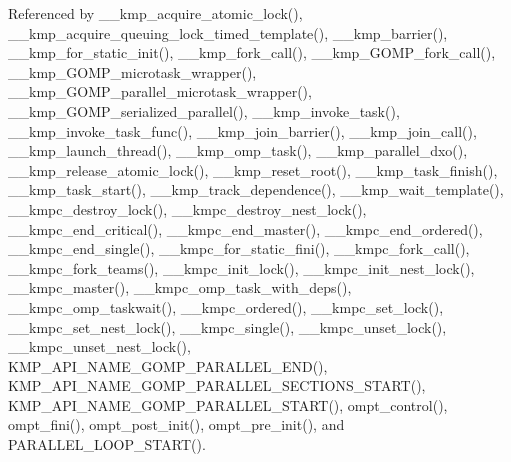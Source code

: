 Referenced by \-\_\-\-\_\-kmp\-\_\-acquire\-\_\-atomic\-\_\-lock(), \-\_\-\-\_\-kmp\-\_\-acquire\-\_\-queuing\-\_\-lock\-\_\-timed\-\_\-template(), \-\_\-\-\_\-kmp\-\_\-barrier(), \-\_\-\-\_\-kmp\-\_\-for\-\_\-static\-\_\-init(), \-\_\-\-\_\-kmp\-\_\-fork\-\_\-call(), \-\_\-\-\_\-kmp\-\_\-\-G\-O\-M\-P\-\_\-fork\-\_\-call(), \-\_\-\-\_\-kmp\-\_\-\-G\-O\-M\-P\-\_\-microtask\-\_\-wrapper(), \-\_\-\-\_\-kmp\-\_\-\-G\-O\-M\-P\-\_\-parallel\-\_\-microtask\-\_\-wrapper(), \-\_\-\-\_\-kmp\-\_\-\-G\-O\-M\-P\-\_\-serialized\-\_\-parallel(), \-\_\-\-\_\-kmp\-\_\-invoke\-\_\-task(), \-\_\-\-\_\-kmp\-\_\-invoke\-\_\-task\-\_\-func(), \-\_\-\-\_\-kmp\-\_\-join\-\_\-barrier(), \-\_\-\-\_\-kmp\-\_\-join\-\_\-call(), \-\_\-\-\_\-kmp\-\_\-launch\-\_\-thread(), \-\_\-\-\_\-kmp\-\_\-omp\-\_\-task(), \-\_\-\-\_\-kmp\-\_\-parallel\-\_\-dxo(), \-\_\-\-\_\-kmp\-\_\-release\-\_\-atomic\-\_\-lock(), \-\_\-\-\_\-kmp\-\_\-reset\-\_\-root(), \-\_\-\-\_\-kmp\-\_\-task\-\_\-finish(), \-\_\-\-\_\-kmp\-\_\-task\-\_\-start(), \-\_\-\-\_\-kmp\-\_\-track\-\_\-dependence(), \-\_\-\-\_\-kmp\-\_\-wait\-\_\-template(), \-\_\-\-\_\-kmpc\-\_\-destroy\-\_\-lock(), \-\_\-\-\_\-kmpc\-\_\-destroy\-\_\-nest\-\_\-lock(), \-\_\-\-\_\-kmpc\-\_\-end\-\_\-critical(), \-\_\-\-\_\-kmpc\-\_\-end\-\_\-master(), \-\_\-\-\_\-kmpc\-\_\-end\-\_\-ordered(), \-\_\-\-\_\-kmpc\-\_\-end\-\_\-single(), \-\_\-\-\_\-kmpc\-\_\-for\-\_\-static\-\_\-fini(), \-\_\-\-\_\-kmpc\-\_\-fork\-\_\-call(), \-\_\-\-\_\-kmpc\-\_\-fork\-\_\-teams(), \-\_\-\-\_\-kmpc\-\_\-init\-\_\-lock(), \-\_\-\-\_\-kmpc\-\_\-init\-\_\-nest\-\_\-lock(), \-\_\-\-\_\-kmpc\-\_\-master(), \-\_\-\-\_\-kmpc\-\_\-omp\-\_\-task\-\_\-with\-\_\-deps(), \-\_\-\-\_\-kmpc\-\_\-omp\-\_\-taskwait(), \-\_\-\-\_\-kmpc\-\_\-ordered(), \-\_\-\-\_\-kmpc\-\_\-set\-\_\-lock(), \-\_\-\-\_\-kmpc\-\_\-set\-\_\-nest\-\_\-lock(), \-\_\-\-\_\-kmpc\-\_\-single(), \-\_\-\-\_\-kmpc\-\_\-unset\-\_\-lock(), \-\_\-\-\_\-kmpc\-\_\-unset\-\_\-nest\-\_\-lock(), K\-M\-P\-\_\-\-A\-P\-I\-\_\-\-N\-A\-M\-E\-\_\-\-G\-O\-M\-P\-\_\-\-P\-A\-R\-A\-L\-L\-E\-L\-\_\-\-E\-N\-D(), K\-M\-P\-\_\-\-A\-P\-I\-\_\-\-N\-A\-M\-E\-\_\-\-G\-O\-M\-P\-\_\-\-P\-A\-R\-A\-L\-L\-E\-L\-\_\-\-S\-E\-C\-T\-I\-O\-N\-S\-\_\-\-S\-T\-A\-R\-T(), K\-M\-P\-\_\-\-A\-P\-I\-\_\-\-N\-A\-M\-E\-\_\-\-G\-O\-M\-P\-\_\-\-P\-A\-R\-A\-L\-L\-E\-L\-\_\-\-S\-T\-A\-R\-T(), ompt\-\_\-control(), ompt\-\_\-fini(), ompt\-\_\-post\-\_\-init(), ompt\-\_\-pre\-\_\-init(), and P\-A\-R\-A\-L\-L\-E\-L\-\_\-\-L\-O\-O\-P\-\_\-\-S\-T\-A\-R\-T().

